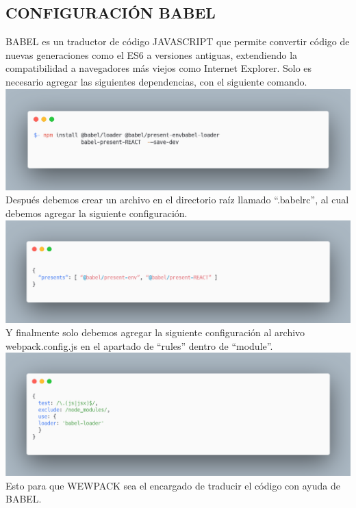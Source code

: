 \subsection{CONFIGURACIÓN BABEL}
BABEL es un traductor de código JAVASCRIPT que permite convertir código de nuevas generaciones como el ES6 a versiones antiguas, extendiendo la compatibilidad a navegadores más viejos como Internet Explorer.
Solo es necesario agregar las siguientes dependencias, con el siguiente comando.
\newline
\newline
\includegraphics[width=1\textwidth]{./Imagenes/image36.png}
\newline
\newline
Después debemos crear un archivo en el directorio raíz llamado “.babelrc”, al cual debemos agregar la siguiente configuración.
\newline
\newline
\includegraphics[width=1\textwidth]{./Imagenes/image17.png}
\newline
\newline
Y finalmente solo debemos agregar la siguiente configuración al archivo webpack.config.js en el apartado de “rules” dentro de “module”.
\newline
\newline
\includegraphics[width=1\textwidth]{./Imagenes/image1.png}
\newline
\newline
Esto para que WEWPACK sea el encargado de traducir el código con ayuda de BABEL.


